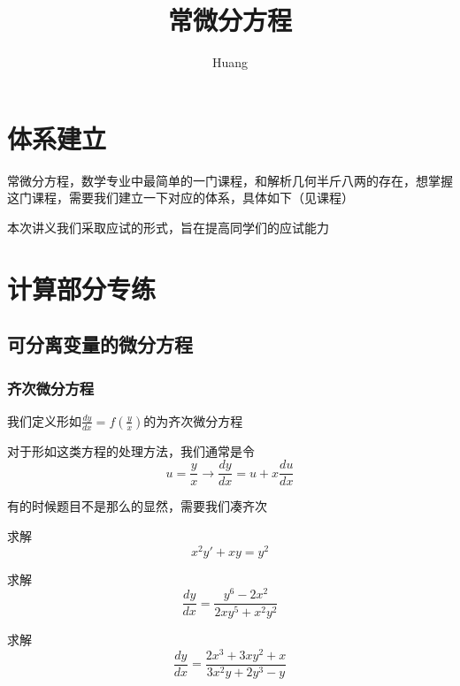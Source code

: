 \documentclass[lang=cn,14pt]{elegantbook}
\title{常微分方程}
\author{ Huang}
\begin{document}
	
	\maketitle
	\frontmatter
	
	\tableofcontents
	
	\mainmatter
	\chapter{体系建立}
	常微分方程，数学专业中最简单的一门课程，和解析几何半斤八两的存在，想掌握这门课程，需要我们建立一下对应的体系，具体如下（见课程）
	
	本次讲义我们采取应试的形式，旨在提高同学们的应试能力
	\chapter{计算部分专练}
	\section{可分离变量的微分方程}
	\subsection{齐次微分方程}
	\begin{definition}[齐次微分方程]
		我们定义形如$\frac{dy}{dx}=f(\frac{y}{x})$的为齐次微分方程
	\end{definition}
	\begin{remark}
		对于形如这类方程的处理方法，我们通常是令
		\begin{equation*}
			u=\frac{y}{x}\rightarrow\frac{dy}{dx}=u+x\frac{du}{dx}
		\end{equation*}
	\end{remark}
	\begin{remark}
		有的时候题目不是那么的显然，需要我们凑齐次
	\end{remark}
	\begin{example}
		求解
		\begin{equation*}
			x^2y'+xy=y^2
		\end{equation*}
	\end{example}
	\vspace{2cm}
	\begin{example}
		求解
		\begin{equation*}
			\frac{dy}{dx}=\frac{y^6-2x^2}{2xy^5+x^2y^2}
		\end{equation*}
	\end{example}
	\vspace{2cm}
	\begin{example}
		求解
		\begin{equation*}
				\frac{dy}{dx}=\frac{2x^3+3xy^{2}+x}{3x^2 y+2y^3-y}
		\end{equation*}
	\end{example}
	\vspace{2cm}
\end{document}
